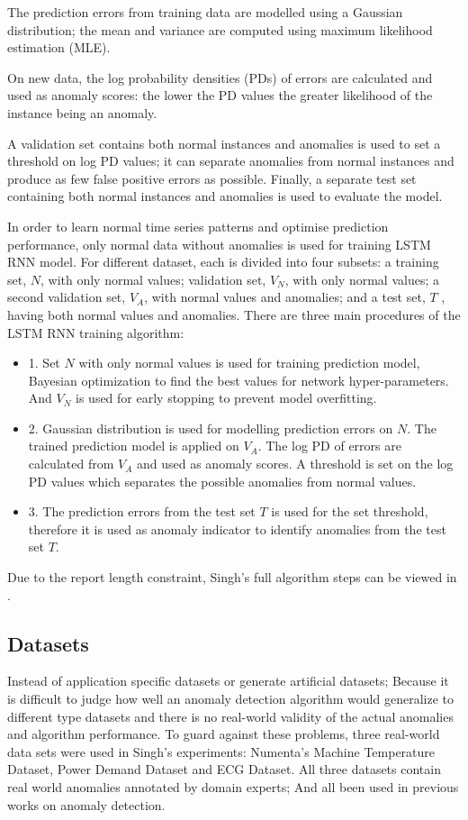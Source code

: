 \documentclass{article}
\begin{document}
The prediction errors from training data are modelled using a Gaussian
distribution; the mean and variance are computed
using maximum likelihood estimation (MLE). 

On new data, the log probability densities (PDs) of errors are calculated and
used as anomaly scores: the lower the PD values the greater likelihood of the
instance being an anomaly.

A validation set contains both normal instances and anomalies is used to set a
threshold on log PD values; it can separate anomalies from normal
instances and produce as few false positive errors as possible. Finally, a
separate test set containing both normal instances and anomalies is used to
evaluate the model.

In order to learn normal time series patterns and optimise prediction
performance, only normal data without anomalies is used for training LSTM RNN
model. For different dataset, each is divided into four subsets: a
training set, $N$, with only normal values; validation set, $V_N$, with
only
normal values; a second validation set, $V_A$, with
normal values and anomalies; and a test set, $T$ , having both normal values
and anomalies.
There are three main procedures of the LSTM RNN training algorithm:
\begin{itemize}
	\setlength{\itemsep}{1pt}
	\setlength{\parskip}{0pt}
	\setlength{\parsep}{0pt}
	\item 1. Set $N$ with only normal values is used for training prediction
model, Bayesian optimization \cite{8-BayesianOp} to find the best values
for network hyper-parameters. And $V_N$ is used for early stopping to prevent
model overfitting.
	\item 2. Gaussian distribution is used for modelling prediction errors on $N$.
The trained prediction model is applied on $V_A$. The log PD of errors are
calculated from $V_A$ and used as anomaly scores. A threshold is set on the log
PD values which separates the possible anomalies from normal values.
	\item 3. The prediction errors from the test set $T$ is used for the set
threshold, therefore it is used as anomaly indicator to identify anomalies from
the test set $T$.
\end{itemize}
Due to the report length constraint, Singh's full algorithm
steps can be viewed in \cite{7-lstmthisis}.


\subsection{Datasets}
Instead of application specific datasets or generate artificial datasets;
Because it is difficult to judge how well an anomaly detection algorithm would
generalize to different type datasets and there is no real-world validity of
the actual anomalies and algorithm performance\cite{7-lstmthisis}. 
To guard against these problems, three real-world data sets were used in
Singh's experiments: Numenta’s Machine
Temperature Dataset, Power Demand Dataset and ECG Dataset. All three datasets
contain real world anomalies annotated by domain experts; And all been used in
previous works on anomaly detection.
\end{document}

